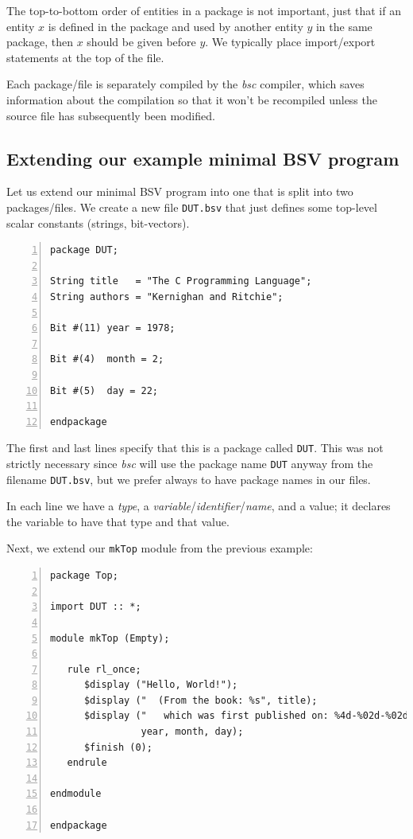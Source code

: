 The top-to-bottom order of entities in a package is not important,
just that if an entity $x$ is defined in the package and used by
another entity $y$ in the same package, then $x$ should be given
before $y$.  We typically place import/export statements at the top of
the file.

Each package/file is separately compiled by the \emph{bsc} compiler,
which saves information about the compilation so that it won't be
recompiled unless the source file has subsequently been modified.

\hdivider


\subsection{Extending our example minimal BSV program}

Let us extend our minimal BSV program into one that is split into two
packages/files.  We create a new file \verb|DUT.bsv| that just defines
some top-level scalar constants (strings, bit-vectors).

{\small
\begin{Verbatim}[frame=single, numbers=left, label=in file Ex\_04\_02/DUT.bsv]
package DUT;

String title   = "The C Programming Language";
String authors = "Kernighan and Ritchie";

Bit #(11) year = 1978;

Bit #(4)  month = 2;

Bit #(5)  day = 22;

endpackage
\end{Verbatim}
}

The first and last lines specify that this is a package called
\verb|DUT|.  This was not strictly necessary since \emph{bsc} will use
the package name \verb|DUT| anyway from the filename \verb|DUT.bsv|,
but we prefer always to have package names in our files.

In each line we have a \emph{type}, a
\emph{variable}/\emph{identifier}/\emph{name}, and a value; it
declares the variable to have that type and that value.

Next, we extend our \verb|mkTop| module from the previous example:

{\small
\begin{Verbatim}[frame=single, numbers=left, label=in file Ex\_04\_02/Top.bsv]
package Top;

import DUT :: *;

module mkTop (Empty);

   rule rl_once;
      $display ("Hello, World!");
      $display ("  (From the book: %s", title);
      $display ("   which was first published on: %4d-%02d-%02d)",
                year, month, day);
      $finish (0);
   endrule

endmodule

endpackage
\end{Verbatim}
}

